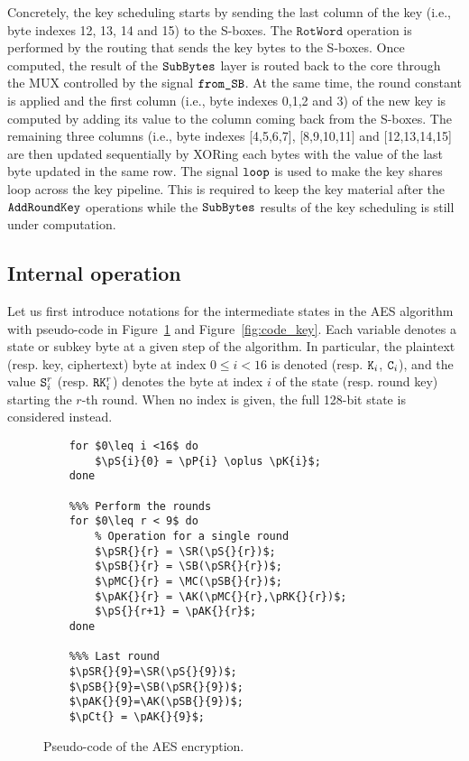 \documentclass{scrartcl}
\begin{document}
Concretely, the key scheduling starts by sending the last column of the key
(i.e., byte indexes 12, 13, 14 and 15) to the S-boxes.  The $\texttt{RotWord}$
operation is performed by the routing that sends the key bytes to the S-boxes.
Once computed, the result of the $\texttt{SubBytes}$ layer is routed back to the core through
the MUX controlled by the signal $\texttt{from\_SB}$.  At the same time,
the round constant is applied and the first column (i.e., byte indexes 0,1,2
and 3) of the new key is computed by adding its value to the column coming back
from the S-boxes.  The remaining three columns (i.e., byte indexes [4,5,6,7],
[8,9,10,11] and [12,13,14,15] are then updated sequentially by XORing each
bytes with the value of the last byte updated in the same row. The signal
$\texttt{loop}$ is used to make the key shares loop across the key pipeline.
This is required to keep the key material after the $\texttt{AddRoundKey}$ operations while the
$\texttt{SubBytes}$ results of the key scheduling is still under computation. 

\subsection{Internal operation}

Let us first introduce notations for the intermediate states in the AES algorithm with
pseudo-code in Figure~\ref{fig:code_round} and Figure~\ref{fig:code_key}.
Each variable denotes a state or subkey byte at a given step of the algorithm.
In particular, the plaintext (resp. key, ciphertext) byte at index $0\leq i<16$
is denoted  (resp. $\texttt{K}_{i}$, $\texttt{C}_{i}$), and the value $\texttt{S}_{i}^{r}$ (resp.
$\texttt{RK}_{i}^{r}$) denotes the byte at index $i$ of the state (resp. round key)
starting the $r$-th round.
When no index is given, the full 128-bit state is considered instead.

\begin{figure}
    \begin{lstlisting}[frame=single]
    %%% First key addition
    for $0\leq i <16$ do
        $\pS{i}{0} = \pP{i} \oplus \pK{i}$;
    done
    
    %%% Perform the rounds
    for $0\leq r < 9$ do 
        % Operation for a single round
        $\pSR{}{r} = \SR(\pS{}{r})$;
        $\pSB{}{r} = \SB(\pSR{}{r})$;
        $\pMC{}{r} = \MC(\pSB{}{r})$;
        $\pAK{}{r} = \AK(\pMC{}{r},\pRK{}{r})$;
        $\pS{}{r+1} = \pAK{}{r}$;
    done
    
    %%% Last round
    $\pSR{}{9}=\SR(\pS{}{9})$;
    $\pSB{}{9}=\SB(\pSR{}{9})$;
    $\pAK{}{9}=\AK(\pSB{}{9})$;
    $\pCt{} = \pAK{}{9}$;
    \end{lstlisting}
    \caption{Pseudo-code of the AES encryption.}
    \label{fig:code_round}
\end{figure}
\end{document}
